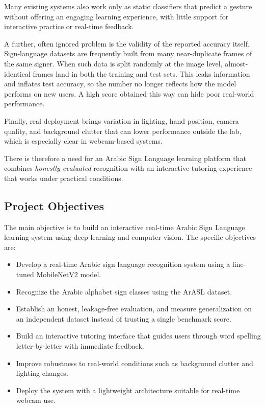 Many existing systems also work only as static classifiers that predict a gesture
without offering an engaging learning experience, with little support for
interactive practice or real-time feedback.

A further, often ignored problem is the validity of the reported accuracy itself.
Sign-language datasets are frequently built from many near-duplicate frames of the
same signer. When such data is split randomly at the image level, almost-identical
frames land in both the training and test sets. This leaks information and inflates
test accuracy, so the number no longer reflects how the model performs on new
users. A high score obtained this way can hide poor real-world performance.

Finally, real deployment brings variation in lighting, hand position, camera
quality, and background clutter that can lower performance outside the lab, which
is especially clear in webcam-based systems.

There is therefore a need for an Arabic Sign Language learning platform that
combines \emph{honestly evaluated} recognition with an interactive tutoring
experience that works under practical conditions.

\subsection{Project Objectives}
The main objective is to build an interactive real-time Arabic Sign Language
learning system using deep learning and computer vision. The specific objectives
are:
\begin{itemize}
  \item Develop a real-time Arabic sign language recognition system using a
        fine-tuned MobileNetV2 model.
  \item Recognize the Arabic alphabet sign classes using the ArASL dataset.
  \item Establish an honest, leakage-free evaluation, and measure generalization on
        an independent dataset instead of trusting a single benchmark score.
  \item Build an interactive tutoring interface that guides users through word
        spelling letter-by-letter with immediate feedback.
  \item Improve robustness to real-world conditions such as background clutter and
        lighting changes.
  \item Deploy the system with a lightweight architecture suitable for real-time
        webcam use.
\end{itemize}

